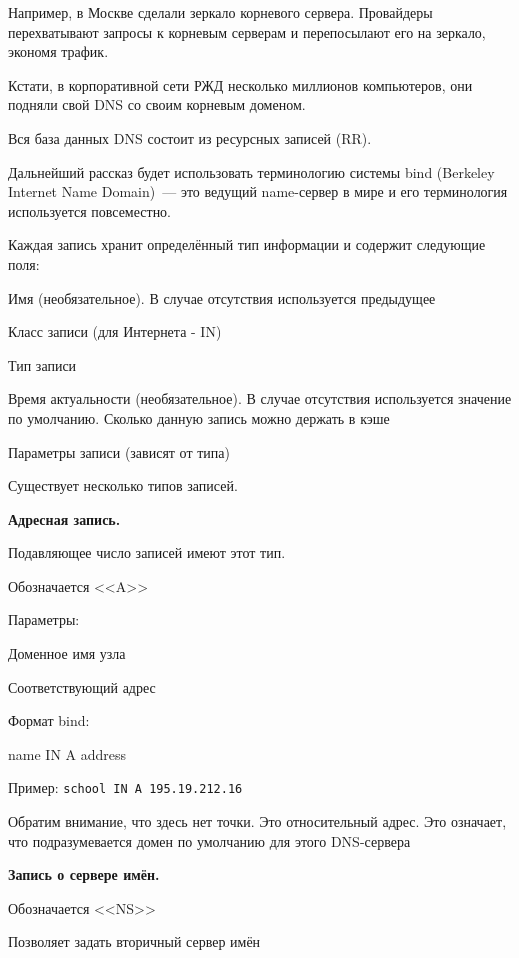 Например, в Москве сделали зеркало корневого сервера. Провайдеры перехватывают запросы к корневым серверам и перепосылают его на зеркало, экономя трафик.

Кстати, в корпоративной сети РЖД несколько миллионов компьютеров, они подняли свой DNS со своим корневым доменом.

Вся база данных DNS состоит из ресурсных записей (RR).

Дальнейший рассказ будет использовать терминологию системы bind (Berkeley Internet Name Domain)~--- это ведущий name-сервер в мире и его терминология используется повсеместно.

Каждая запись хранит определённый тип информации и содержит следующие поля:
\begin{MyItemize}
    \item Имя (необязательное). В случае отсутствия используется предыдущее
    \item Класс записи (для Интернета - IN)
    \item Тип записи
    \item Время актуальности (необязательное). В случае отсутствия используется значение по умолчанию. Сколько данную запись можно держать в кэше
    \item Параметры записи (зависят от типа)
\end{MyItemize}

Существует несколько типов записей.

{\bf Адресная запись.}

Подавляющее число записей имеют этот тип.

Обозначается <<A>>

Параметры:
\begin{MyItemize}
    \item Доменное имя узла
    \item Соответствующий адрес
\end{MyItemize}
Формат bind:
\begin{MyItemize}
    \item name IN A address
\end{MyItemize}
Пример: {\tt school IN A 195.19.212.16}

Обратим внимание, что здесь нет точки. Это относительный адрес. Это означает, что подразумевается домен по умолчанию для этого DNS-сервера

{\bf Запись о сервере имён.}

Обозначается <<NS>>

Позволяет задать вторичный сервер имён

